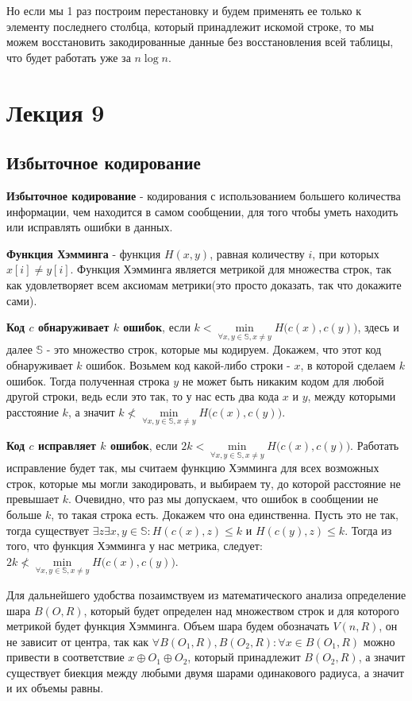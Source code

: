\documentclass{article}
\begin{document}
Но если мы 1 раз построим перестановку и будем применять ее только к элементу последнего столбца, который принадлежит искомой строке, то мы можем восстановить закодированные данные без восстановления всей таблицы, что будет работать уже за $n\log n$.
\section{Лекция 9}
\subsection{Избыточное кодирование}
\textbf{Избыточное кодирование} - кодирования с использованием большего количества информации, чем находится в самом сообщении, для того чтобы уметь находить или исправлять ошибки в данных. 

\textbf{Функция Хэмминга} - функция $H(x,y)$, равная количеству $i$, при которых $x[i]\neq y[i]$. Функция Хэмминга является метрикой для множества строк, так как удовлетворяет всем аксиомам метрики(это просто доказать, так что докажите сами). 

\textbf{Код $c$ обнаруживает $k$ ошибок}, если $k < \min\limits_{\forall x,y \in \mathbb{S}, x\neq y} H\biggl(c(x),c(y)\biggr)$, здесь и далее $\mathbb{S}$ - это множество строк, которые мы кодируем. Докажем, что этот код обнаруживает $k$ ошибок. Возьмем код какой-либо строки - $x$, в которой сделаем $k$ ошибок. Тогда полученная строка $y$ не может быть никаким кодом для любой другой строки, ведь если это так, то у нас есть два кода $x$ и $y$, между которыми расстояние $k$, а значит $k \nless \min\limits_{\forall x,y \in \mathbb{S}, x\neq y} H\biggl(c(x),c(y)\biggr)$.

\textbf{Код $c$ исправляет $k$ ошибок}, если $2k < \min\limits_{\forall x,y \in \mathbb{S}, x\neq y} H\biggl(c(x),c(y)\biggr)$. Работать исправление будет так, мы считаем функцию Хэмминга для всех возможных строк, которые мы могли закодировать, и выбираем ту, до которой расстояние не превышает $k$. Очевидно, что раз мы допускаем, что ошибок в сообщении не больше $k$, то такая строка есть. Докажем что она единственна. Пусть это не так, тогда существует $\exists z\exists x,y\in\mathbb{S}: H(c(x), z) \leq k$ и $H(c(y), z) \leq k$. Тогда из того, что функция Хэмминга у нас метрика, следует: $2k \nless \min\limits_{\forall x,y \in \mathbb{S}, x\neq y} H\biggl(c(x),c(y)\biggr)$.

Для дальнейшего удобства позаимствуем из математического анализа определение шара $B(O, R)$, который будет определен над множеством строк и для которого метрикой будет функция Хэмминга. Объем шара будем обозначать $V(n, R)$, он не зависит от центра, так как $\forall B(O_1,R), B(O_2, R) : \forall x\in B(O_1, R)$ можно привести в соответствие $x \oplus O_1 \oplus O_2$, который принадлежит $B(O_2, R)$, а значит существует биекция между любыми двумя шарами одинакового радиуса, а значит и их объемы равны. 
\end{document}
